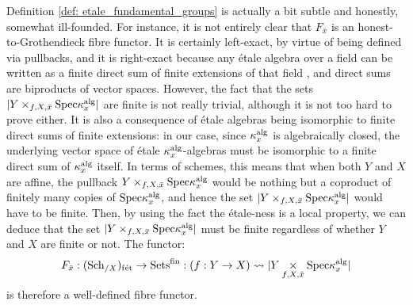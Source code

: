         \begin{remark}
            Definition \ref{def: etale_fundamental_groups} is actually a bit subtle and honestly, somewhat ill-founded. For instance, it is not entirely clear that $F_{\bar{x}}$ is an honest-to-Grothendieck fibre functor. It is certainly left-exact, by virtue of being defined via pullbacks, and it is right-exact because any \'etale algebra over a field can be written as a finite direct sum of finite extensions of that field \cite[\href{https://stacks.math.columbia.edu/tag/00U3}{Tag 00U3}]{stacks}, and direct sums are biproducts of vector spaces. However, the fact that the sets $|Y \x_{f, X, \bar{x}} \Spec \kappa_x^{\alg}|$ are finite is not really trivial, although it is not too hard to prove either. It is also a consequence of \'etale algebras being isomorphic to finite direct sums of finite extensions: in our case, since $\kappa_x^{\mathrm{alg}}$ is algebraically closed, the underlying vector space of \'etale $\kappa_x^{\mathrm{alg}}$-algebras must be isomorphic to a finite direct sum of $\kappa_x^{\mathrm{alg}}$ itself. In terms of schemes, this means that when both $Y$ and $X$ are affine, the pullback $Y \x_{f, X, \bar{x}} \Spec \kappa_x^{\alg}$ would be nothing but a coproduct of finitely many copies of $\mathrm{Spec} \kappa_x^{\mathrm{alg}}$, and hence the set $|Y \x_{f, X, \bar{x}} \Spec \kappa_x^{\alg}|$ would have to be finite. Then, by using the fact the \'etale-ness is a local property, we can deduce that the set $|Y \x_{f, X, \bar{x}} \Spec \kappa_x^{\alg}|$ must be finite regardless of whether $Y$ and $X$ are finite or not. The functor:
                $$F_{\bar{x}}: (\Sch_{/X})_{\fet} \to \Sets^{\fin}: (f: Y \to X) \mapsto |Y \x_{f, X, \bar{x}} \Spec \kappa_x^{\alg}|$$
            is therefore a well-defined fibre functor.
        \end{remark}
    
